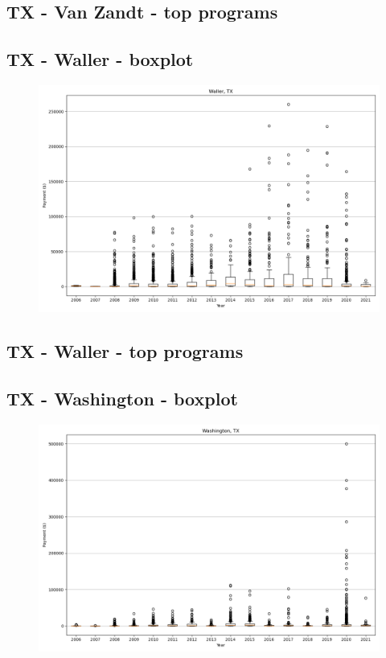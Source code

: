 \subsection*{TX - Van Zandt - top programs}

\newpage
\subsection*{TX - Waller - boxplot}
\begin{figure}[h]
\centering
\includegraphics[width=7in]{../output/boxplots/counties/Waller-TX_boxplot.png}
\end{figure}


\subsection*{TX - Waller - top programs}

\newpage
\subsection*{TX - Washington - boxplot}
\begin{figure}[h]
\centering
\includegraphics[width=7in]{../output/boxplots/counties/Washington-TX_boxplot.png}
\end{figure}


